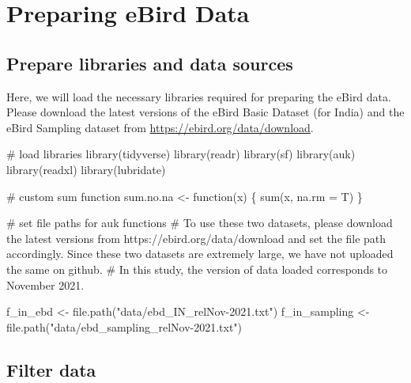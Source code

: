 \documentclass[
]{article}
\newenvironment{Shaded}{}{}
\newcommand{\CommentTok}[1]{\textcolor[rgb]{0.00,0.50,0.00}{#1}}
\newcommand{\ControlFlowTok}[1]{\textcolor[rgb]{0.00,0.00,1.00}{#1}}
\newcommand{\DataTypeTok}[1]{#1}
\newcommand{\KeywordTok}[1]{\textcolor[rgb]{0.00,0.00,1.00}{#1}}
\newcommand{\NormalTok}[1]{#1}
\newcommand{\StringTok}[1]{\textcolor[rgb]{0.00,0.50,0.50}{#1}}
\begin{document}
\hypertarget{preparing-ebird-data}{%
\section{Preparing eBird Data}\label{preparing-ebird-data}}

\hypertarget{prepare-libraries-and-data-sources}{%
\subsection{Prepare libraries and data sources}\label{prepare-libraries-and-data-sources}}

Here, we will load the necessary libraries required for preparing the eBird data. Please download the latest versions of the eBird Basic Dataset (for India) and the eBird Sampling dataset from \url{https://ebird.org/data/download}.

\begin{Shaded}
\begin{Highlighting}[]
\CommentTok{# load libraries}
\KeywordTok{library}\NormalTok{(tidyverse)}
\KeywordTok{library}\NormalTok{(readr)}
\KeywordTok{library}\NormalTok{(sf)}
\KeywordTok{library}\NormalTok{(auk)}
\KeywordTok{library}\NormalTok{(readxl)}
\KeywordTok{library}\NormalTok{(lubridate)}

\CommentTok{# custom sum function}
\NormalTok{sum.no.na <-}\StringTok{ }\ControlFlowTok{function}\NormalTok{(x) \{}
  \KeywordTok{sum}\NormalTok{(x, }\DataTypeTok{na.rm =}\NormalTok{ T)}
\NormalTok{\}}

\CommentTok{# set file paths for auk functions}
\CommentTok{# To use these two datasets, please download the latest versions from https://ebird.org/data/download and set the file path accordingly. Since these two datasets are extremely large, we have not uploaded the same on github.}
\CommentTok{# In this study, the version of data loaded corresponds to November 2021.}

\NormalTok{f_in_ebd <-}\StringTok{ }\KeywordTok{file.path}\NormalTok{(}\StringTok{"data/ebd_IN_relNov-2021.txt"}\NormalTok{)}
\NormalTok{f_in_sampling <-}\StringTok{ }\KeywordTok{file.path}\NormalTok{(}\StringTok{"data/ebd_sampling_relNov-2021.txt"}\NormalTok{)}
\end{Highlighting}
\end{Shaded}

\hypertarget{filter-data}{%
\subsection{Filter data}\label{filter-data}}
\end{document}
